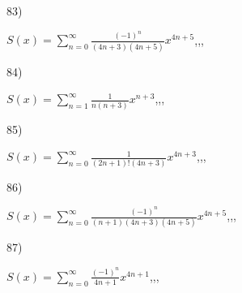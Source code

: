 \documentclass[11pt, ukrainian]{article}
\begin{document}
\par
\vspace{0.9cm}
83) \space 
{%
{$S(x)=\sum\limits_{n=0}^{\infty}{\frac{(-1)^n}{(4n+3)(4n+5)}}{x^{{4n+5}}}$},,, \par \smallskip  
}
\par
\vspace{0.9cm}
84) \space 
{%
{$S(x)=\sum\limits_{n=1}^{\infty}{\frac{1}{n(n+3)}}{x^{{n+3}}}$},,, \par \smallskip  
}
\par
\vspace{0.9cm}
85) \space 
{%
{$S(x)=\sum\limits_{n=0}^{\infty}{\frac{1}{(2n+1)!(4n+3)}}{x^{{4n+3}}}$},,, \par \smallskip  
}
\par
\vspace{0.9cm}
86) \space 
{%
{$S(x)=\sum\limits_{n=0}^{\infty}{\frac{(-1)^n}{(n+1)(4n+3)(4n+5)}}{x^{{4n+5}}}$},,, \par \smallskip  
}
\par
\vspace{0.9cm}
87) \space 
{%
{$S(x)=\sum\limits_{n=0}^{\infty}{\frac{(-1)^n}{4n+1}}{x^{{4n+1}}}$},,, \par \smallskip  
}
\end{document}

